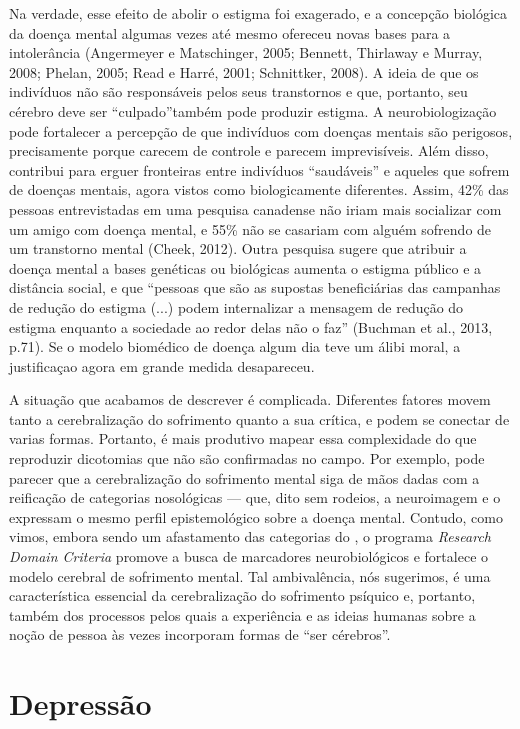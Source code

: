 Na verdade, esse efeito de abolir o estigma foi exagerado, e a concepção
biológica da doença mental algumas vezes até mesmo ofereceu novas bases
para a intolerância (Angermeyer e Matschinger, 2005; Bennett, Thirlaway
e Murray, 2008; Phelan, 2005; Read e Harré, 2001; Schnittker, 2008). A
ideia de que os indivíduos não são responsáveis pelos seus transtornos e
que, portanto, seu cérebro deve ser ``culpado''também pode produzir
estigma. A neurobiologização pode fortalecer a percepção de que
indivíduos com doenças mentais são perigosos, precisamente porque
carecem de controle e parecem imprevisíveis. Além disso, contribui para
erguer fronteiras entre indivíduos ``saudáveis'' e aqueles que sofrem de
doenças mentais, agora vistos como biologicamente diferentes. Assim,
42\% das pessoas entrevistadas em uma pesquisa canadense não iriam mais
socializar com um amigo com doença mental, e 55\% não se casariam com
alguém sofrendo de um transtorno mental (Cheek, 2012). Outra pesquisa
sugere que atribuir a doença mental a bases genéticas ou biológicas
aumenta o estigma público e a distância social, e que ``pessoas que são
as supostas beneficiárias das campanhas de redução do estigma (...)
podem internalizar a mensagem de redução do estigma enquanto a sociedade
ao redor delas não o faz'' (Buchman et al., 2013, p.71). Se o modelo
biomédico de doença algum dia teve um álibi moral, a justificaçao agora
em grande medida desapareceu.

A situação que acabamos de descrever é complicada. Diferentes fatores
movem tanto a cerebralização do sofrimento quanto a sua crítica, e podem
se conectar de varias formas. Portanto, é mais produtivo mapear essa
complexidade do que reproduzir dicotomias que não são confirmadas no
campo. Por exemplo, pode parecer que a cerebralização do sofrimento
mental siga de mãos dadas com a reificação de categorias nosológicas ---
que, dito sem rodeios, a neuroimagem e o \emph{} expressam o mesmo
perfil epistemológico sobre a doença mental. Contudo, como vimos, embora
sendo um afastamento das categorias do \emph{}, o programa
\emph{Research Domain Criteria} promove a busca de marcadores
neurobiológicos e fortalece o modelo cerebral de sofrimento mental. Tal
ambivalência, nós sugerimos, é uma característica essencial da
cerebralização do sofrimento psíquico e, portanto, também dos processos
pelos quais a experiência e as ideias humanas sobre a noção de pessoa às
vezes incorporam formas de ``ser cérebros''.

\chapter{Depressão}

